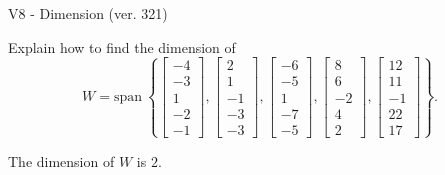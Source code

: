 \begin{exercise}
  \begin{exerciseTitle}V8 - Dimension (ver. 321)\end{exerciseTitle}
  \begin{exerciseStatement}
    Explain how to find the dimension of 
\[W=\mathrm{span}\ \left\{\left[\begin{array}{r}
-4 \\
-3 \\
1 \\
-2 \\
-1
\end{array}\right] , \left[\begin{array}{r}
2 \\
1 \\
-1 \\
-3 \\
-3
\end{array}\right] , \left[\begin{array}{r}
-6 \\
-5 \\
1 \\
-7 \\
-5
\end{array}\right] , \left[\begin{array}{r}
8 \\
6 \\
-2 \\
4 \\
2
\end{array}\right] , \left[\begin{array}{r}
12 \\
11 \\
-1 \\
22 \\
17
\end{array}\right]\right\}.\]



  \end{exerciseStatement}
  \begin{exerciseAnswer}
   The dimension of \(W\) is  \(2\).
  


  \end{exerciseAnswer}
\end{exercise}